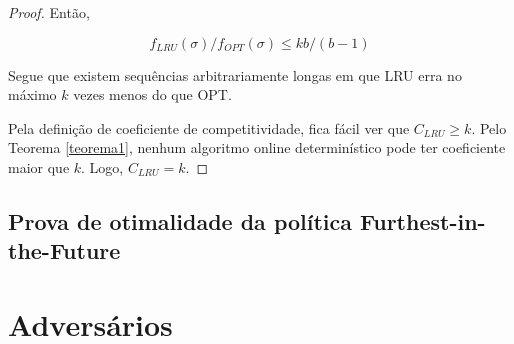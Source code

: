 \documentclass[a4paper,oneside,reqno,12pt]{amsart}
\begin{document}
\begin{proof}
Então, 

\[f_{LRU}(\sigma)/f_{OPT}(\sigma) \le kb/(b-1)\]

Segue que existem sequências arbitrariamente longas em que LRU erra no máximo $k$ vezes menos do que OPT.

Pela definição de coeficiente de competitividade, fica fácil ver que $C_{LRU} \ge k$. Pelo Teorema \ref{teorema1}, nenhum algoritmo online determinístico pode ter coeficiente maior que $k$. Logo, $C_{LRU} = k$.
\end{proof}


\subsection{Prova de otimalidade da política Furthest-in-the-Future}

\section{Adversários}

\begingroup
{}
\printbibliography
\endgroup

\normalsize





\end{document}
